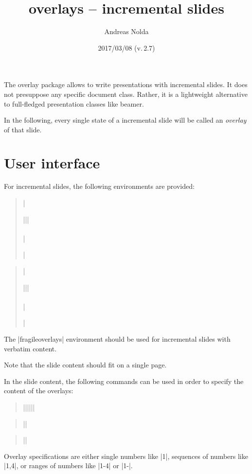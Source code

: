 \documentclass[a4paper]{ltxdoc}
\begin{document}
\title{\textsf{overlays} -- incremental slides}
\author{Andreas Nolda}
\date{2017/03/08 (v.\,2.7)}
\maketitle

\noindent The \textsf{overlay} package allows to write presentations with
incremental slides. It does not presuppose any specific document class. Rather,
it is a lightweight alternative to full-fledged presentation classes like
\textsf{beamer}.

In the following, every single state of a incremental slide will be called an
\emph{overlay} of that slide.

\section{User interface}

For incremental slides, the following environments are provided:
\begin{quote}
|\begin{overlays}{||}| \\
 \\
|\end{overlays}|
\end{quote}
\begin{quote}
|\begin{fragileoverlays}{||}| \\
 \\
|\end{fragileoverlays}|
\end{quote}
The |fragileoverlays| environment should be used for incremental slides with
verbatim content.

Note that the slide content should fit on a single page.

\DescribeMacro{\alert}
\DescribeMacro{\visible}
\DescribeMacro{\only}
In the slide content, the following commands can be used in order
to specify the content of the overlays:
\begin{quote}
|\alert{||}{||}|
\end{quote}
\begin{quote}
||
\end{quote}
\begin{quote}
||
\end{quote} Overlay specifications are either single numbers like |1|, sequences
of numbers like |1,4|, or ranges of numbers like |1-4| or |1-|.
\end{document}
